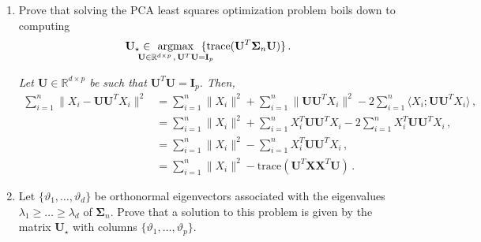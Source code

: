 \documentclass[a4paper,10pt,fleqn]{article}
\newcommand{\eqsp}{\,}
\newcommand{\rset}{\ensuremath{\mathbb{R}}}
\newcommand{\1}{\ensuremath{\mathbbm{1}}}
\newcommand{\bfU}{\mathbf{U}}
\newcommand{\bfX}{\mathbf{X}}
\newcommand{\bfs}{\mathbf{\Sigma}}
\newcommand{\bfA}{\mathbf{A}}
\newcommand{\bfV}{\mathbf{V}}
\newcommand{\bfI}{\mathbf{I}}
\newcommand{\bfD}{\mathbf{D}}
\begin{document}
\begin{enumerate}
\item Prove that solving the PCA least squares optimization problem boils down to computing
$$
\bfU_{\star} \in \hspace{-0.5cm}\underset{\bfU\in \rset^{d\times p}\eqsp,\eqsp \bfU^T\bfU = \bfI_p}{\mathrm{argmax}} \hspace{-.4cm}\{ \mathrm{trace}(\bfU^T\bfs_n\bfU)\}\eqsp.
$$

\vspace{.2cm}

{\em
Let $\bfU\in\rset^{d\times p}$ be such that $\bfU^T\bfU = \bfI_p$. Then,
\begin{align*}
\sum_{i=1}^n\|X_i - \bfU\bfU^TX_i\|^2 &= \sum_{i=1}^n\|X_i\|^2 + \sum_{i=1}^n\|\bfU\bfU^TX_i\|^2 - 2\sum_{i=1}^n\langle X_i;\bfU\bfU^TX_i\rangle\eqsp,\\
&=  \sum_{i=1}^n\|X_i\|^2 + \sum_{i=1}^nX^T_i\bfU\bfU^TX_i - 2\sum_{i=1}^nX^T_i\bfU\bfU^TX_i\eqsp,\\
&=  \sum_{i=1}^n\|X_i\|^2 - \sum_{i=1}^nX^T_i\bfU\bfU^TX_i\eqsp,\\
&=  \sum_{i=1}^n\|X_i\|^2 - \mathrm{trace}(\bfU^T\bfX\bfX^T\bfU)\eqsp.
\end{align*}
}
\item Let $\{\vartheta_1,\ldots,\vartheta_d\}$ be orthonormal eigenvectors associated with the eigenvalues $\lambda_1\geqslant \ldots \geqslant \lambda_d$ of $\bfs_n$. Prove that a solution to this problem is given by the matrix $\bfU_{\star}$ with columns $\{\vartheta_1,\ldots,\vartheta_p\}$.

\vspace{.2cm}


\end{enumerate}
\end{document}
